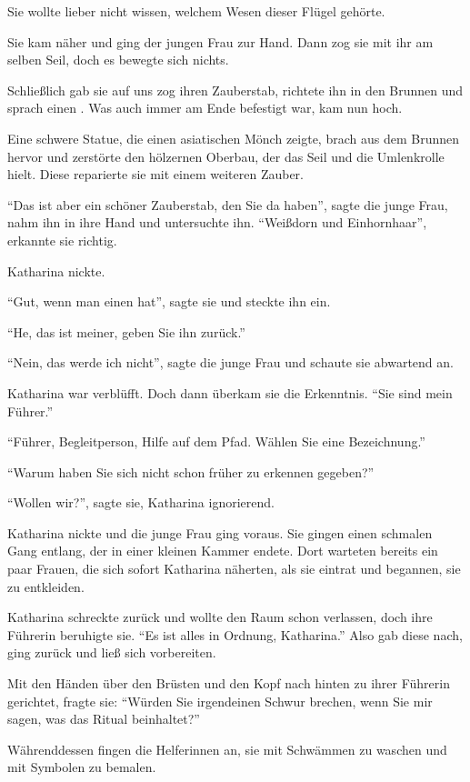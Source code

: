 Sie wollte lieber nicht wissen, welchem Wesen dieser Flügel gehörte.

Sie kam näher und ging der jungen Frau zur Hand. Dann zog sie mit ihr am selben Seil, doch es bewegte sich nichts.

Schließlich gab sie auf uns zog ihren Zauberstab, richtete ihn in den Brunnen und sprach einen . Was auch immer am Ende befestigt war, kam nun hoch.

Eine schwere Statue, die einen asiatischen Mönch zeigte, brach aus dem Brunnen hervor und zerstörte den hölzernen Oberbau, der das Seil und die Umlenkrolle hielt. Diese reparierte sie mit einem weiteren Zauber.

\enquote{Das ist aber ein schöner Zauberstab, den Sie da haben}, sagte die junge Frau, nahm ihn in ihre Hand und untersuchte ihn. \enquote{Weißdorn und Einhornhaar}, erkannte sie richtig.

Katharina nickte.

\enquote{Gut, wenn man einen hat}, sagte sie und steckte ihn ein.

\enquote{He, das ist meiner, geben Sie ihn zurück.}

\enquote{Nein, das werde ich nicht}, sagte die junge Frau und schaute sie abwartend an.

Katharina war verblüfft. Doch dann überkam sie die Erkenntnis. \enquote{Sie sind mein Führer.}

\enquote{Führer, Begleitperson, Hilfe auf dem Pfad. Wählen Sie eine Bezeichnung.}

\enquote{Warum haben Sie sich nicht schon früher zu erkennen gegeben?}

\enquote{Wollen wir?}, sagte sie, Katharina ignorierend.

Katharina nickte und die junge Frau ging voraus. Sie gingen einen schmalen Gang entlang, der in einer kleinen Kammer endete. Dort warteten bereits ein paar Frauen, die sich sofort Katharina näherten, als sie eintrat und begannen, sie zu entkleiden.

Katharina schreckte zurück und wollte den Raum schon verlassen, doch ihre Führerin beruhigte sie. \enquote{Es ist alles in Ordnung, Katharina.} Also gab diese nach, ging zurück und ließ sich vorbereiten.

Mit den Händen über den Brüsten und den Kopf nach hinten zu ihrer Führerin gerichtet, fragte sie: \enquote{Würden Sie irgendeinen Schwur brechen, wenn Sie mir sagen, was das Ritual beinhaltet?}

Währenddessen fingen die Helferinnen an, sie mit Schwämmen zu waschen und mit Symbolen zu bemalen.

